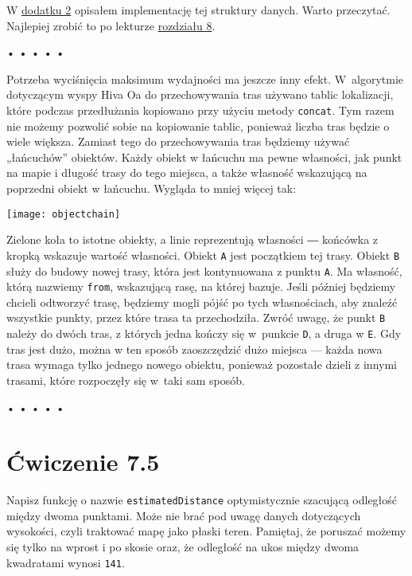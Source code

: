 W \hyperref[app:2]{dodatku 2} opisałem implementację tej struktury danych. Warto przeczytać. Najlepiej zrobić to po lekturze \hyperref[chap:8]{rozdziału 8}.



\begin{center}
• • • • •
\end{center}

  
Potrzeba wyciśnięcia maksimum wydajności ma jeszcze inny efekt. W~algorytmie dotyczącym wyspy Hiva Oa do przechowywania tras używano tablic lokalizacji, które podczas przedłużania kopiowano przy użyciu metody \texttt{concat}. Tym razem nie możemy pozwolić sobie na kopiowanie tablic, ponieważ liczba tras będzie o wiele większa. Zamiast tego do przechowywania tras będziemy używać „łańcuchów” obiektów. Każdy obiekt w łańcuchu ma pewne własności, jak punkt na mapie i długość trasy do tego miejsca, a także własność wskazującą na poprzedni obiekt w łańcuchu. Wygląda to mniej więcej tak:

  \bigskip 
 \centerline{\texttt{[image: objectchain]}} 
 \smallskip
  
Zielone koła to istotne obiekty, a linie reprezentują własności ― końcówka z kropką wskazuje wartość własności. Obiekt \texttt{A} jest początkiem tej trasy. Obiekt \texttt{B} służy do budowy nowej trasy, która jest kontynuowana z punktu \texttt{A}. Ma własność, którą nazwiemy \texttt{from}, wskazującą rasę, na której bazuje. Jeśli później będziemy chcieli odtworzyć trasę, będziemy mogli pójść po tych własnościach, aby znaleźć wszystkie punkty, przez które trasa ta przechodziła. Zwróć uwagę, że punkt \texttt{B} należy do dwóch tras, z których jedna kończy się w~punkcie \texttt{D}, a druga w \texttt{E}. Gdy tras jest dużo, można w ten sposób zaoszczędzić dużo miejsca — każda nowa trasa wymaga tylko jednego nowego obiektu, ponieważ pozostałe dzieli z innymi trasami, które rozpoczęły się w~taki sam sposób.



\begin{center}
• • • • •
\end{center}

  
\section*{Ćwiczenie 7.5}
\label{sec:7.5}
  
    
Napisz funkcję o nazwie \texttt{estimatedDistance} optymistycznie szacującą odległość między dwoma punktami. Może nie brać pod uwagę danych dotyczących wysokości, czyli traktować mapę jako płaski teren. Pamiętaj, że poruszać możemy się tylko na wprost i po skosie oraz, że odległość na ukos między dwoma kwadratami wynosi \texttt{141}.

